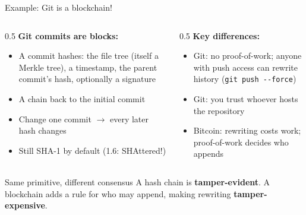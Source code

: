 \ifdefined\PRESENTATION\else\PassOptionsToClass{handout}{beamer}\fi\documentclass[aspectratio=169, lualatex]{beamer}
\begin{document}
\begin{frame}{Example: Git is a blockchain!}
	\begin{columns}[c]
		\begin{column}{0.5\textwidth}
			\textbf{Git commits are blocks:}
			\begin{itemize}
				\item A commit hashes: the file tree (itself a Merkle tree), a timestamp, the parent commit's hash, optionally a signature
				\item A chain back to the initial commit
				\item Change one commit $\rightarrow$ every later hash changes
				\item Still SHA-1 by default (1.6: SHAttered!)
			\end{itemize}
		\end{column}
		\begin{column}{0.5\textwidth}
			\textbf{Key differences:}
			\begin{itemize}
				\item Git: no proof-of-work; anyone with push access can rewrite history (\texttt{git push -{}-force})
				\item Git: you trust whoever hosts the repository
				\item Bitcoin: rewriting costs work; proof-of-work decides who appends
			\end{itemize}
		\end{column}
	\end{columns}
	\begin{exampleblock}{Same primitive, different consensus}
		A hash chain is \textbf{tamper-evident}. A blockchain adds a rule for who may append, making rewriting \textbf{tamper-expensive}.
	\end{exampleblock}
\end{frame}
\end{document}
